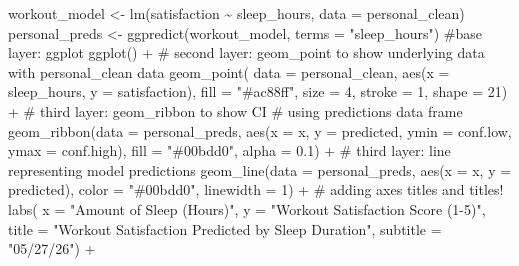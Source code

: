 \documentclass[
  letterpaper,
  DIV=11,
  numbers=noendperiod]{scrartcl}
\newenvironment{Shaded}{\begin{snugshade}}{\end{snugshade}}
\newcommand{\AttributeTok}[1]{\textcolor[rgb]{0.40,0.45,0.13}{#1}}
\newcommand{\CommentTok}[1]{\textcolor[rgb]{0.37,0.37,0.37}{#1}}
\newcommand{\DecValTok}[1]{\textcolor[rgb]{0.68,0.00,0.00}{#1}}
\newcommand{\FloatTok}[1]{\textcolor[rgb]{0.68,0.00,0.00}{#1}}
\newcommand{\FunctionTok}[1]{\textcolor[rgb]{0.28,0.35,0.67}{#1}}
\newcommand{\NormalTok}[1]{\textcolor[rgb]{0.00,0.23,0.31}{#1}}
\newcommand{\OtherTok}[1]{\textcolor[rgb]{0.00,0.23,0.31}{#1}}
\newcommand{\SpecialCharTok}[1]{\textcolor[rgb]{0.37,0.37,0.37}{#1}}
\newcommand{\StringTok}[1]{\textcolor[rgb]{0.13,0.47,0.30}{#1}}
\begin{document}
\begin{Shaded}
\begin{Highlighting}[]
\NormalTok{workout\_model }\OtherTok{\textless{}{-}} \FunctionTok{lm}\NormalTok{(satisfaction }\SpecialCharTok{\textasciitilde{}}\NormalTok{ sleep\_hours, }\AttributeTok{data =}\NormalTok{ personal\_clean)}
\NormalTok{personal\_preds }\OtherTok{\textless{}{-}} \FunctionTok{ggpredict}\NormalTok{(workout\_model, }
                            \AttributeTok{terms =} \StringTok{"sleep\_hours"}\NormalTok{)}
\CommentTok{\#base layer: ggplot }
\FunctionTok{ggplot}\NormalTok{() }\SpecialCharTok{+}
  \CommentTok{\# second layer: geom\_point to show underlying data with personal\_clean data}
  \FunctionTok{geom\_point}\NormalTok{( }\AttributeTok{data =}\NormalTok{ personal\_clean, }
       \FunctionTok{aes}\NormalTok{(}\AttributeTok{x =}\NormalTok{ sleep\_hours, }
       \AttributeTok{y =}\NormalTok{ satisfaction), }
       \AttributeTok{fill =} \StringTok{"\#ac88ff"}\NormalTok{,}
       \AttributeTok{size =} \DecValTok{4}\NormalTok{,}
       \AttributeTok{stroke =} \DecValTok{1}\NormalTok{,}
       \AttributeTok{shape =} \DecValTok{21}\NormalTok{) }\SpecialCharTok{+}
  \CommentTok{\# third layer: geom\_ribbon to show CI}
 \CommentTok{\# using predictions data frame}
 \FunctionTok{geom\_ribbon}\NormalTok{(}\AttributeTok{data =}\NormalTok{ personal\_preds,}
             \FunctionTok{aes}\NormalTok{(}\AttributeTok{x =}\NormalTok{ x,}
                 \AttributeTok{y =}\NormalTok{ predicted, }
                 \AttributeTok{ymin =}\NormalTok{ conf.low,}
                 \AttributeTok{ymax =}\NormalTok{ conf.high),}
             \AttributeTok{fill =} \StringTok{"\#00bdd0"}\NormalTok{,}
             \AttributeTok{alpha =} \FloatTok{0.1}\NormalTok{) }\SpecialCharTok{+}
  \CommentTok{\# third layer: line representing model predictions}
  \FunctionTok{geom\_line}\NormalTok{(}\AttributeTok{data =}\NormalTok{ personal\_preds,}
            \FunctionTok{aes}\NormalTok{(}\AttributeTok{x =}\NormalTok{ x,}
                \AttributeTok{y =}\NormalTok{ predicted),}
            \AttributeTok{color =} \StringTok{"\#00bdd0"}\NormalTok{,}
            \AttributeTok{linewidth =} \DecValTok{1}\NormalTok{) }\SpecialCharTok{+}
  \CommentTok{\# adding axes titles and titles!}
  \FunctionTok{labs}\NormalTok{(}
    \AttributeTok{x =} \StringTok{"Amount of Sleep (Hours)"}\NormalTok{,}
    \AttributeTok{y =} \StringTok{"Workout Satisfaction Score (1{-}5)"}\NormalTok{,}
    \AttributeTok{title =} \StringTok{"Workout Satisfaction Predicted by Sleep Duration"}\NormalTok{,}
    \AttributeTok{subtitle =} \StringTok{"05/27/26"}\NormalTok{) }\SpecialCharTok{+}

\end{Highlighting}
\end{Shaded}
\end{document}
